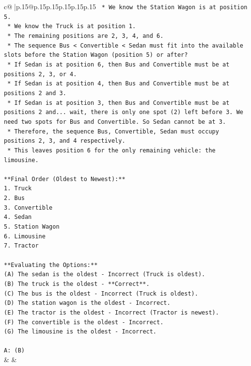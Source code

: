 \documentclass{article}
\begin{document}
{\begin{supertabular}{c@{$\;$}|p{.15\linewidth}@{}p{.15\linewidth}p{.15\linewidth}p{.15\linewidth}p{.15\linewidth}p{.15\linewidth}}
{{{\texttt{    *   We know the Station Wagon is at position 5.} \\
\texttt{    *   We know the Truck is at position 1.} \\
\texttt{    *   The remaining positions are 2, 3, 4, and 6.} \\
\texttt{    *   The sequence Bus < Convertible < Sedan must fit into the available slots before the Station Wagon (position 5) or after?} \\
\texttt{        *   If Sedan is at position 6, then Bus and Convertible must be at positions 2, 3, or 4.} \\
\texttt{        *   If Sedan is at position 4, then Bus and Convertible must be at positions 2 and 3.} \\
\texttt{        *   If Sedan is at position 3, then Bus and Convertible must be at positions 2 and... wait, there is only one spot (2) left before 3. We need two spots for Bus and Convertible. So Sedan cannot be at 3.} \\
\texttt{        *   Therefore, the sequence Bus, Convertible, Sedan must occupy positions 2, 3, and 4 respectively.} \\
\texttt{        *   This leaves position 6 for the only remaining vehicle: the limousine.} \\
\\ 
\texttt{**Final Order (Oldest to Newest):**} \\
\texttt{1.  Truck} \\
\texttt{2.  Bus} \\
\texttt{3.  Convertible} \\
\texttt{4.  Sedan} \\
\texttt{5.  Station Wagon} \\
\texttt{6.  Limousine} \\
\texttt{7.  Tractor} \\
\\ 
\texttt{**Evaluating the Options:**} \\
\texttt{(A) The sedan is the oldest {-} Incorrect (Truck is oldest).} \\
\texttt{(B) The truck is the oldest {-} **Correct**.} \\
\texttt{(C) The bus is the oldest {-} Incorrect (Truck is oldest).} \\
\texttt{(D) The station wagon is the oldest {-} Incorrect.} \\
\texttt{(E) The tractor is the oldest {-} Incorrect (Tractor is newest).} \\
\texttt{(F) The convertible is the oldest {-} Incorrect.} \\
\texttt{(G) The limousine is the oldest {-} Incorrect.} \\
\\ 
\texttt{A: (B)} \\
            }
        }
    }
    & & \\ \\


\end{supertabular}}
\end{document}
